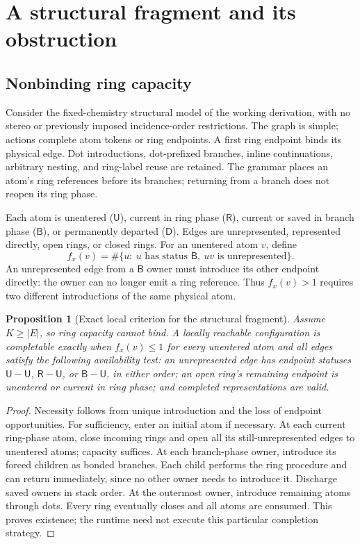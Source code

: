 \documentclass[11pt,a4paper]{article}
\newtheorem{proposition}{Proposition}
\begin{document}
\section{A structural fragment and its obstruction}\label{sec:fragment}
\subsection{Nonbinding ring capacity}
Consider the fixed-chemistry structural model of the working derivation, with
no stereo or previously imposed incidence-order restrictions. The graph is
simple; actions complete atom tokens or ring endpoints. A first ring endpoint
binds its physical edge. Dot introductions, dot-prefixed branches, inline
continuations, arbitrary nesting, and ring-label reuse are retained.
The grammar places an atom's ring references before its branches; returning
from a branch does not reopen its ring phase.\cite{opensmiles,attempt}

Each atom is unentered (\(\mathsf U\)), current in ring phase (\(\mathsf R\)),
current or saved in branch phase (\(\mathsf B\)), or permanently departed
(\(\mathsf D\)). Edges are unrepresented, represented directly, open rings, or
closed rings. For an unentered atom \(v\), define
\[
 f_x(v)=\#\{u:\ u\text{ has status }\mathsf B,
                      \ uv\text{ is unrepresented}\}.
\]
An unrepresented edge from a \(\mathsf B\) owner must introduce its other endpoint
directly: the owner can no longer emit a ring reference. Thus \(f_x(v)>1\)
requires two different introductions of the same physical atom.

\begin{proposition}[Exact local criterion for the structural fragment]
Assume \(K\ge |E|\), so ring capacity cannot bind. A locally reachable
configuration is completable exactly when \(f_x(v)\le1\) for every unentered
atom and all edges satisfy the following availability test: an unrepresented
edge has endpoint statuses \(\mathsf U\!\! -\!\mathsf U\),
\(\mathsf R\!\! -\!\mathsf U\), or \(\mathsf B\!\! -\!\mathsf U\), in either
order; an open ring's remaining endpoint is unentered or current in ring phase;
and completed representations are valid.
\end{proposition}
\begin{proof}
Necessity follows from unique introduction and the loss of endpoint opportunities.
For sufficiency, enter an initial atom if necessary. At each current ring-phase atom,
close incoming rings and open
all its still-unrepresented edges to unentered atoms; capacity suffices. At each
branch-phase owner, introduce its forced children as bonded branches. Each child
performs the ring procedure and can return immediately, since no other owner
needs to introduce it. Discharge saved owners in stack order. At the outermost
owner, introduce remaining atoms through dots. Every ring eventually closes and
all atoms are consumed. This proves existence; the runtime need not execute
this particular completion strategy.\cite{attempt}
\end{proof}
\end{document}
